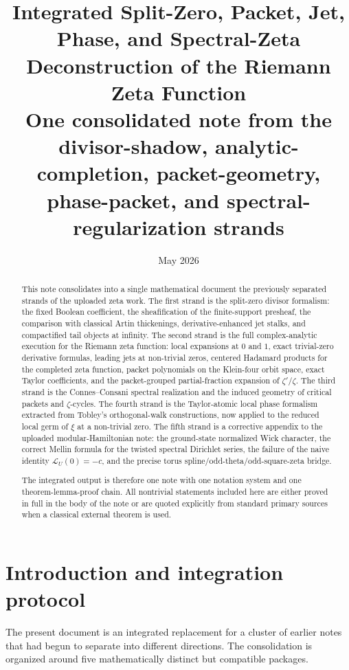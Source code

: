 \documentclass[11pt,a4paper]{article}
\title{Integrated Split-Zero, Packet, Jet, Phase, and Spectral-Zeta Deconstruction of the Riemann Zeta Function\\
One consolidated note from the divisor-shadow, analytic-completion, packet-geometry, phase-packet, and spectral-regularization strands}
\author{}
\date{May 2026}
\numberwithin{equation}{section}
\theoremstyle{definition}
\theoremstyle{remark}
\begin{document}
\maketitle

\begin{abstract}
This note consolidates into a single mathematical document the previously separated strands of the uploaded zeta work.  The first strand is the split-zero divisor formalism: the fixed Boolean coefficient, the sheafification of the finite-support presheaf, the comparison with classical Artin thickenings, derivative-enhanced jet stalks, and compactified tail objects at infinity.  The second strand is the full complex-analytic execution for the Riemann zeta function: local expansions at $0$ and $1$, exact trivial-zero derivative formulas, leading jets at non-trivial zeros, centered Hadamard products for the completed zeta function, packet polynomials on the Klein-four orbit space, exact Taylor coefficients, and the packet-grouped partial-fraction expansion of $\zeta'/\zeta$.  The third strand is the Connes--Consani spectral realization and the induced geometry of critical packets and $\zeta$-cycles.  The fourth strand is the Taylor-atomic local phase formalism extracted from Tobley's orthogonal-walk constructions, now applied to the reduced local germ of $\xi$ at a non-trivial zero.  The fifth strand is a corrective appendix to the uploaded modular-Hamiltonian note: the ground-state normalized Wick character, the correct Mellin formula for the twisted spectral Dirichlet series, the failure of the naive identity $\mathcal L_U(0)=-c$, and the precise torus spline/odd-theta/odd-square-zeta bridge.

The integrated output is therefore one note with one notation system and one theorem-lemma-proof chain.  All nontrivial statements included here are either proved in full in the body of the note or are quoted explicitly from standard primary sources when a classical external theorem is used.
\end{abstract}

\tableofcontents

\section{Introduction and integration protocol}

The present document is an integrated replacement for a cluster of earlier notes that had begun to separate into different directions.  The consolidation is organized around five mathematically distinct but compatible packages.
\end{document}
